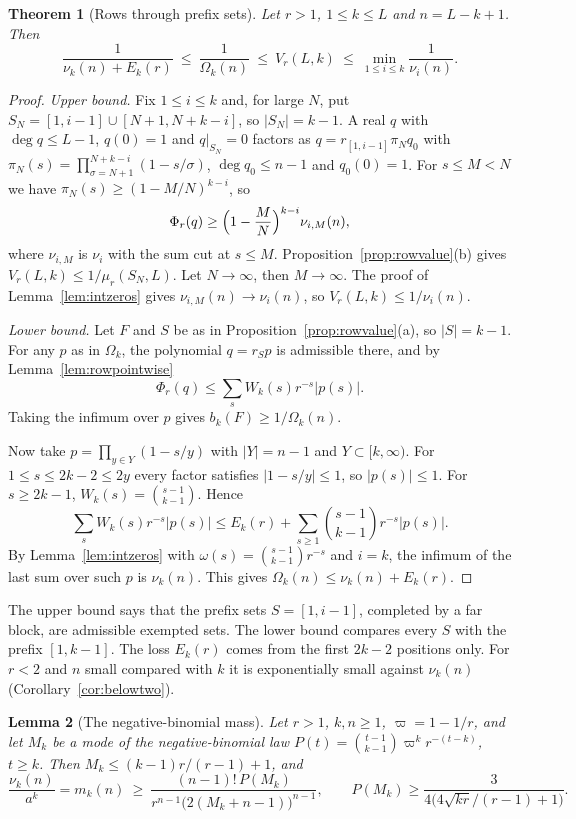 \documentclass[11pt]{article}
\newtheorem{theorem}{Theorem}[section]
\newtheorem{lemma}[theorem]{Lemma}
\begin{document}
\begin{theorem}[Rows through prefix sets]\label{thm:prefixrows}
Let $r>1$, $1\le k\le L$ and $n=L-k+1$.  Then
\begin{equation}\label{eq:prefixsandwich}
  \frac1{\nu_k(n)+E_k(r)}\ \le\ \frac1{\Omega_k(n)}\ \le\ V_r(L,k)\ \le\
  \min_{1\le i\le k}\frac1{\nu_i(n)} .
\end{equation}
\end{theorem}

\begin{proof}
\emph{Upper bound.}  Fix $1\le i\le k$ and, for large $N$, put
$S_N=[1,i-1]\cup[N+1,N+k-i]$, so $|S_N|=k-1$.  A real $q$ with
$\deg q\le L-1$, $q(0)=1$ and $q|_{S_N}=0$ factors as
$q=r_{[1,i-1]}\pi_Nq_0$ with $\pi_N(s)=\prod_{\sigma=N+1}^{N+k-i}(1-s/\sigma)$,
$\deg q_0\le n-1$ and $q_0(0)=1$.  For $s\le M<N$ we have
$\pi_N(s)\ge(1-M/N)^{k-i}$, so
\[
  \Phi_r(q)\ge\Bigl(1-\frac MN\Bigr)^{k-i}\nu_{i,M}(n),
\]
where $\nu_{i,M}$ is $\nu_i$ with the sum cut at $s\le M$.
Proposition~\ref{prop:rowvalue}(b) gives
$V_r(L,k)\le1/\mu_r(S_N,L)$.  Let $N\to\infty$, then $M\to\infty$.  The
proof of Lemma~\ref{lem:intzeros} gives $\nu_{i,M}(n)\to\nu_i(n)$, so
$V_r(L,k)\le1/\nu_i(n)$.

\emph{Lower bound.}  Let $F$ and $S$ be as in
Proposition~\ref{prop:rowvalue}(a), so $|S|=k-1$.  For any $p$ as in
$\Omega_k$, the polynomial $q=r_Sp$ is admissible there, and by
Lemma~\ref{lem:rowpointwise}
\[
  \Phi_r(q)\le\sum_sW_k(s)r^{-s}|p(s)| .
\]
Taking the infimum over $p$ gives $b_k(F)\ge1/\Omega_k(n)$.

Now take $p=\prod_{y\in Y}(1-s/y)$ with $|Y|=n-1$ and $Y\subset[k,\infty)$.
For $1\le s\le2k-2\le2y$ every factor satisfies $|1-s/y|\le1$, so
$|p(s)|\le1$.  For $s\ge2k-1$, $W_k(s)=\binom{s-1}{k-1}$.  Hence
\[
  \sum_sW_k(s)r^{-s}|p(s)|\le E_k(r)+\sum_{s\ge1}\binom{s-1}{k-1}r^{-s}|p(s)| .
\]
By Lemma~\ref{lem:intzeros} with $\omega(s)=\binom{s-1}{k-1}r^{-s}$ and
$i=k$, the infimum of the last sum over such $p$ is $\nu_k(n)$.  This gives
$\Omega_k(n)\le\nu_k(n)+E_k(r)$.
\end{proof}

The upper bound says that the prefix sets $S=[1,i-1]$, completed by a far
block, are admissible exempted sets.  The lower bound compares every $S$
with the prefix $[1,k-1]$.  The loss $E_k(r)$ comes from the first $2k-2$
positions only.  For $r<2$ and $n$ small compared with $k$ it is exponentially small
against $\nu_k(n)$ (Corollary~\ref{cor:belowtwo}).

\begin{lemma}[The negative-binomial mass]\label{lem:nbmass}
Let $r>1$, $k,n\ge1$, $\varpi=1-1/r$, and let $M_k$ be a mode of the
negative-binomial law $P(t)=\binom{t-1}{k-1}\varpi^k r^{-(t-k)}$, $t\ge k$.
Then $M_k\le(k-1)r/(r-1)+1$, and
\[
  \frac{\nu_k(n)}{a^k}=m_k(n)\ \ge\
  \frac{(n-1)!\,P(M_k)}{r^{n-1}\bigl(2(M_k+n-1)\bigr)^{n-1}},
  \qquad
  P(M_k)\ge\frac3{4\bigl(4\sqrt{kr}/(r-1)+1\bigr)} .
\]
\end{lemma}
\end{document}
